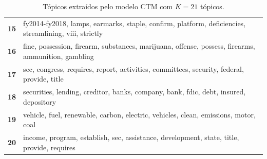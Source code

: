\begin{table}[htpb]
\begin{tabularx}{\textwidth}{@{}l X@{}}
        \textbf{15} & fy2014-fy2018, lamps, earmarks, staple, confirm, platform, deficiencies, streamlining, viii, strictly \\
        \textbf{16} & fine, possession, firearm, substances, marijuana, offense, possess, firearms, ammunition, gambling \\
        \textbf{17} & sec, congress, requires, report, activities, committees, security, federal, provide, title \\
        \textbf{18} & securities, lending, creditor, banks, company, bank, fdic, debt, insured, depository \\
        \textbf{19} & vehicle, fuel, renewable, carbon, electric, vehicles, clean, emissions, motor, coal \\
        \textbf{20} & income, program, establish, sec, assistance, development, state, title, provide, requires \\
        \bottomrule
    \end{tabularx}
    \caption{Tópicos extraídos pelo modelo CTM com $K=21$ tópicos.}
    \label{tab:topicos_ctm_21}
\end{table}
